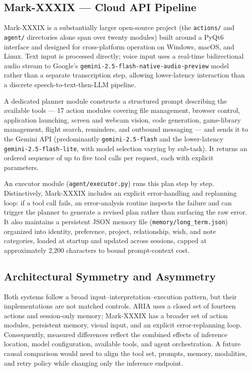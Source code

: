 \documentclass[conference]{IEEEtran}
\begin{document}
\subsection{Mark-XXXIX --- Cloud API Pipeline}

Mark-XXXIX is a substantially larger open-source project (the \texttt{actions/} and \texttt{agent/} directories alone span over twenty modules) built around a PyQt6 interface and designed for cross-platform operation on Windows, macOS, and Linux. Text input is processed directly; voice input uses a real-time bidirectional audio stream to Google's \texttt{gemini-2.5-flash-native-audio-preview} model rather than a separate transcription step, allowing lower-latency interaction than a discrete speech-to-text-then-LLM pipeline.

A dedicated planner module constructs a structured prompt describing the available tools --- 17 action modules covering file management, browser control, application launching, screen and webcam vision, code generation, game-library management, flight search, reminders, and outbound messaging --- and sends it to the Gemini API (predominantly \texttt{gemini-2.5-flash} and the lower-latency \texttt{gemini-2.5-flash-lite}, with model selection varying by sub-task). It returns an ordered sequence of up to five tool calls per request, each with explicit parameters.

An executor module (\texttt{agent/executor.py}) runs this plan step by step. Distinctively, Mark-XXXIX includes an explicit error-handling and replanning loop: if a tool call fails, an error-analysis routine inspects the failure and can trigger the planner to generate a revised plan rather than surfacing the raw error. It also maintains a persistent JSON memory file (\texttt{memory/long\_term.json}) organized into identity, preference, project, relationship, wish, and note categories, loaded at startup and updated across sessions, capped at approximately 2,200 characters to bound prompt-context cost.

\subsection{Architectural Symmetry and Asymmetry}

Both systems follow a broad input--interpretation--execution pattern, but their implementations are not matched controls. ARIA uses a closed set of fourteen actions and session-only memory; Mark-XXXIX has a broader set of action modules, persistent memory, visual input, and an explicit error-replanning loop. Consequently, measured differences reflect the combined effects of inference location, model configuration, available tools, and agent orchestration. A future causal comparison would need to align the tool set, prompts, memory, modalities, and retry policy while changing only the inference endpoint.
\end{document}
